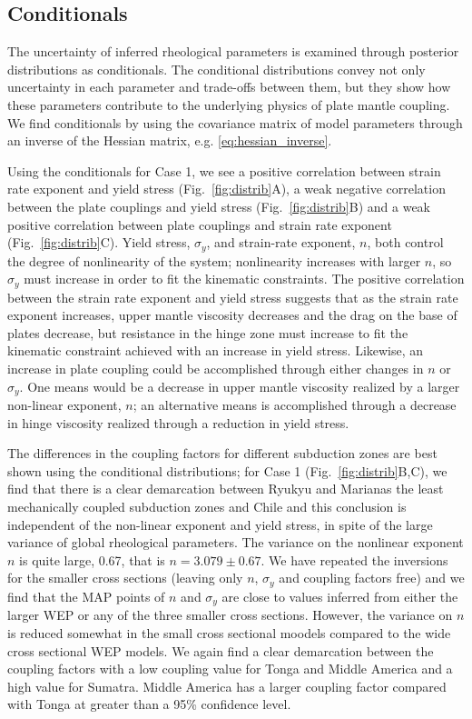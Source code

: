 \documentclass[12pt]{article}
\begin{document}
{\subsection{Conditionals}

The uncertainty of inferred rheological parameters is examined through posterior distributions as conditionals. The conditional distributions convey not only uncertainty in each parameter and trade-offs between them, but they show how these parameters contribute to the underlying physics of plate mantle coupling. 
We find conditionals by using the covariance matrix of model parameters
through an inverse of the Hessian matrix, e.g. \eqref{eq:hessian_inverse}.

Using the conditionals for Case 1, we see a positive correlation between strain rate exponent and yield stress (Fig.~\ref{fig:distrib}A), a weak negative correlation between the plate couplings and yield stress (Fig.~\ref{fig:distrib}B) and a weak positive correlation between plate couplings and strain rate exponent (Fig.~\ref{fig:distrib}C). 
Yield stress, $\sigma_y$, and strain-rate exponent, $n$, both control the degree of nonlinearity of the system; nonlinearity increases with larger $n$, so $\sigma_y$ must increase in order to fit the kinematic constraints.
The positive correlation between the strain rate exponent and yield stress suggests that as the strain rate exponent increases, upper mantle viscosity decreases and the drag on the base of plates decrease, but resistance in the hinge zone must increase to fit the kinematic constraint achieved with an increase in yield stress. 
Likewise, an increase in plate coupling could be accomplished through either changes in $n$ or $\sigma_y$. One means would be a decrease in upper mantle viscosity realized by a larger non-linear exponent, $n$;  
an alternative means is accomplished through a decrease in hinge viscosity realized through a reduction in yield stress.  


The differences in the coupling factors for different subduction zones are
best shown using the conditional distributions; 
for Case 1  (Fig.~\ref{fig:distrib}B,C), we find that there is a clear demarcation between Ryukyu and Marianas the least mechanically coupled subduction zones and Chile
and this conclusion is independent of the non-linear exponent and yield stress, in spite of the large variance of global rheological parameters.
The variance on the nonlinear exponent $n$ is quite large, 0.67, that is $n=3.079 \pm 0.67$.
We have repeated the inversions for the smaller cross sections (leaving only $n$, $\sigma_y$ and coupling factors free) and we find that
the MAP points of $n$ and $\sigma_y$ are close to values inferred from either the larger WEP or any of the three smaller cross sections. However, the variance on $n$ is reduced somewhat in the small cross sectional moodels compared to the wide cross sectional WEP models.
We again find a clear demarcation between the coupling factors with a low coupling value for Tonga and Middle America and a high value for Sumatra.
Middle America has a larger coupling factor compared with Tonga at greater than a 95\% confidence level.

}
\end{document}
